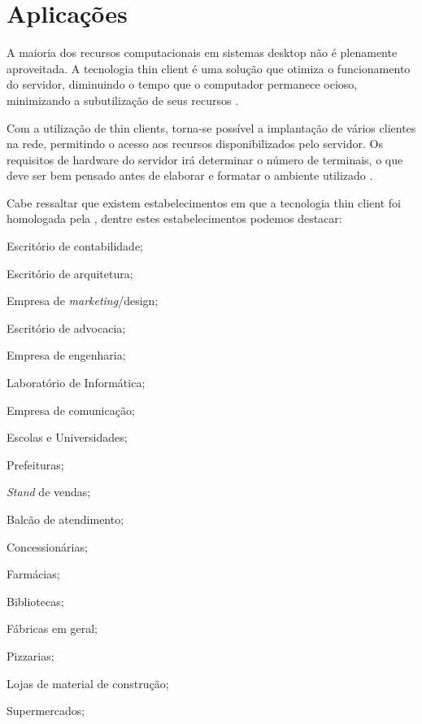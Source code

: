 \documentclass[
	12pt,				%
	openright,			%
	twoside,			%
	a4paper,			%
	chapter=TITLE,		%
	english,			%
	brazil				%
	]{abntex2}
\begin{document}
\newpage







\section{Aplicações}

A maioria dos recursos computacionais em sistemas desktop não é plenamente aproveitada. A tecnologia thin client é uma solução que otimiza o funcionamento do servidor, diminuindo o tempo que o computador permanece ocioso, minimizando a subutilização de seus recursos \cite{thinclientbrasil}. 

Com a utilização de thin clients, torna-se possível a implantação de vários clientes na rede, permitindo o acesso aos recursos disponibilizados pelo servidor. Os requisitos de hardware do servidor irá determinar o número de terminais, o que deve ser bem pensado antes de elaborar e formatar o ambiente utilizado \cite{thinclientbrasil}. 

Cabe ressaltar que existem estabelecimentos em que a tecnologia thin client foi homologada pela , dentre estes estabelecimentos podemos destacar:


\begin{alineas}
\item Escritório de contabilidade;
\item Escritório de arquitetura;
\item Empresa de \textit{marketing}/design;
\item Escritório de advocacia;
\item Empresa de engenharia;
\item Laboratório de Informática;
\item Empresa de comunicação;
\item Escolas e Universidades;
\item Prefeituras;
\item \textit{Stand} de vendas;
\item Balcão de atendimento;
\item Concessionárias;
\item Farmácias;
\item Bibliotecas;
\item Fábricas em geral;
\item Pizzarias;
\item Lojas de material de construção;
\item Supermercados;
\end{alineas}
\end{document}
